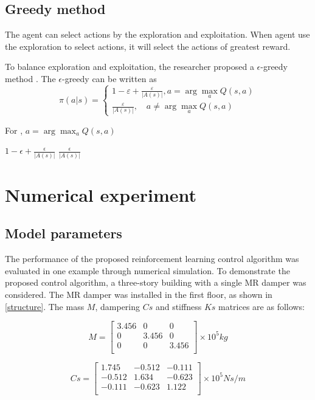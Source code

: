 \subsection{Greedy method}
The agent can select actions by the exploration and exploitation. When agent use the exploration to select actions, it will select the actions of greatest reward.

To balance exploration and exploitation, the researcher proposed a $\epsilon$-greedy method \citep{}. The $\epsilon$-greedy can be written as
\begin{equation}
\pi(a | s)=\left\{\begin{array}{c}
{1-\varepsilon+\frac{\varepsilon}{|A(s)|}, a=\arg \max _{a} Q(s, a)} \\
{\frac{\varepsilon}{|A(s)|}, \quad a \neq \arg \max _{a} Q(s, a)}
\end{array}\right.
\end{equation}

For ,
$a=\arg \max _{a} Q(s, a)$

$1- \epsilon + \frac{\epsilon}{|A(s)|}$
$\frac{\epsilon}{|A(s)|}$

\section{Numerical experiment}
\subsection{Model parameters}
The performance of the proposed reinforcement learning control algorithm was evaluated in one example through numerical simulation. To demonstrate the proposed control algorithm, a three-story building with a single MR damper was considered. The MR damper was installed in the first floor, as shown in \ref{structure}. The mass $M$, dampering $Cs$ and stiffness $Ks$ matrices are as follows:

\begin{equation}       
M=\left[                 
  \begin{array}{ccc}   
   3.456 & 0 & 0 \\  
    0 & 3.456 & 0 \\ 
   0 & 0 &  3.456 \\
  \end{array}
\right]     
\times 10^{5} kg        
\end{equation}

\begin{equation}       
Cs=\left[                 
  \begin{array}{ccc}   
    1.745 & -0.512 & -0.111\\
    -0.512 & 1.634 & -0.623 \\
    -0.111 & -0.623 & 1.122 \\
  \end{array}
\right]     
\times 10^{5} N s/m        
\end{equation}

